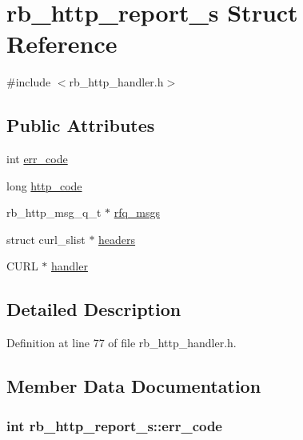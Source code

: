 \hypertarget{structrb__http__report__s}{}\section{rb\+\_\+http\+\_\+report\+\_\+s Struct Reference}
\label{structrb__http__report__s}


{\ttfamily \#include $<$rb\+\_\+http\+\_\+handler.\+h$>$}

\subsection*{Public Attributes}
\begin{DoxyCompactItemize}
\item 
int \hyperlink{structrb__http__report__s_a26726b20726473d985a703e0c7266d3f}{err\+\_\+code}
\item 
long \hyperlink{structrb__http__report__s_a44a22dfbde3f5d2c5eafba73f5be2afa}{http\+\_\+code}
\item 
rb\+\_\+http\+\_\+msg\+\_\+q\+\_\+t $\ast$ \hyperlink{structrb__http__report__s_a7752d311c68a4f7019eebb162cb72553}{rfq\+\_\+msgs}
\item 
struct curl\+\_\+slist $\ast$ \hyperlink{structrb__http__report__s_a2bb10e85675569e7ed4cdb87055241b7}{headers}
\item 
C\+U\+R\+L $\ast$ \hyperlink{structrb__http__report__s_acbc5a7e21356d5e35d19363db4fed9ca}{handler}
\end{DoxyCompactItemize}


\subsection{Detailed Description}


Definition at line 77 of file rb\+\_\+http\+\_\+handler.\+h.



\subsection{Member Data Documentation}
\hypertarget{structrb__http__report__s_a26726b20726473d985a703e0c7266d3f}{}
\subsubsection[{err\+\_\+code}]{\setlength{\rightskip}{0pt plus 5cm}int rb\+\_\+http\+\_\+report\+\_\+s\+::err\+\_\+code}\label{structrb__http__report__s_a26726b20726473d985a703e0c7266d3f}


